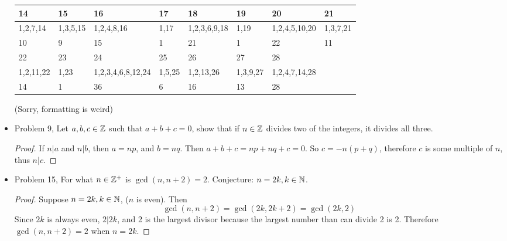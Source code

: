 \documentclass[hidelinks,12pt]{article}
\begin{document}
\begin{itemize}
\begin{table}[h]
\begin{tabular}{|l|l|l|l|l|l|l|l|}
\rowcolor[HTML]{CBCEFB} 
14                                & 15                           & 16                                        & 17                             & 18                                & 19                               & 20                                    & 21       \\ \hline
\rowcolor[HTML]{34FF34} 
1,2,7,14                          & 1,3,5,15                     & 1,2,4,8,16                                & 1,17                           & 1,2,3,6,9,18                      & 1,19                             & 1,2,4,5,10,20                         & 1,3,7,21 \\ \hline
\rowcolor[HTML]{FFCE93} 
10                                & 9                            & 15                                        & 1                              & 21                                & 1                                & 22                                    & 11       \\ \hline
\cellcolor[HTML]{CBCEFB}22        & \cellcolor[HTML]{CBCEFB}23   & \cellcolor[HTML]{CBCEFB}24                & \cellcolor[HTML]{CBCEFB}25     & \cellcolor[HTML]{CBCEFB}26        & \cellcolor[HTML]{CBCEFB}27       & \cellcolor[HTML]{CBCEFB}28            &          \\ \hline
\cellcolor[HTML]{67FD9A}1,2,11,22 & \cellcolor[HTML]{67FD9A}1,23 & \cellcolor[HTML]{67FD9A}1,2,3,4,6,8,12,24 & \cellcolor[HTML]{67FD9A}1,5,25 & \cellcolor[HTML]{67FD9A}1,2,13,26 & \cellcolor[HTML]{67FD9A}1,3,9,27 & \cellcolor[HTML]{67FD9A}1,2,4,7,14,28 &          \\ \hline
\cellcolor[HTML]{FFCE93}14        & \cellcolor[HTML]{FFCE93}1    & \cellcolor[HTML]{FFCE93}36                & \cellcolor[HTML]{FFCE93}6      & \cellcolor[HTML]{FFCE93}16        & \cellcolor[HTML]{FFCE93}13       & \cellcolor[HTML]{FFCE93}28            &          \\ \hline
\end{tabular}
\end{table}
(Sorry, formatting is weird)
\newpage\item Problem 9, Let $a,b,c\in\mathbb{Z}$ such that $a+b+c=0$, show that if $n\in\mathbb{Z}$ divides two of the integers, it divides all three.
\begin{proof}
If $n|a$ and $n|b$, then $a=np$, and $b=nq$. Then $a+b+c=np+nq+c=0$. So $c=-n(p+q)$, therefore $c$ is some multiple of $n$, thus $n|c$.
\end{proof}
\item Problem 15, For what $n\in\mathbb{Z}^+$ is $\gcd(n,n+2)=2$. Conjecture: $n=2k,k\in\mathbb{N}$.
\begin{proof}
Suppose $n=2k,k\in\mathbb{N}$, ($n$ is even). Then $$\gcd(n,n+2)=\gcd(2k,2k+2)=\gcd(2k,2)$$Since $2k$ is always even, $2|2k$, and 2 is the largest divisor because the largest number than can divide 2 is 2. Therefore $\gcd(n,n+2)=2$ when $n=2k$.
\end{proof}
\end{itemize}
\end{document}
